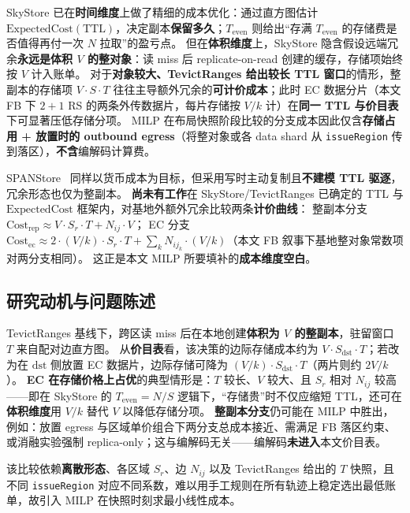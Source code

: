 \documentclass[conference]{IEEEtran}
\begin{document}
SkyStore 已在\textbf{时间维度}上做了精细的成本优化：通过直方图估计 $\mathrm{ExpectedCost}(\mathrm{TTL})$，决定副本\textbf{保留多久}；$T_{\mathrm{even}}$ 则给出``存满 $T_{\mathrm{even}}$ 的存储费是否值得再付一次 $N$ 拉取''的盈亏点。
但在\textbf{体积维度}上，SkyStore 隐含假设远端冗余\textbf{永远是体积 $V$ 的整对象}：读 miss 后 replicate-on-read 创建的缓存，存储项始终按 $V$ 计入账单。
对于\textbf{对象较大、TevictRanges 给出较长 TTL 窗口}的情形，整副本的存储项 $V{\cdot}S{\cdot}T$ 往往主导额外冗余的\textbf{可计价成本}；此时 EC 数据分片（本文 FB 下 $2{+}1$ RS 的两条外传数据片，每片存储按 $V/k$ 计）在\textbf{同一 TTL 与价目表}下可显著压低存储分项。
MILP 在布局快照阶段比较的分支成本因此仅含\textbf{存储占用 + 放置时的 outbound egress}（将整对象或各 data shard 从 \texttt{issueRegion} 传到落区），\textbf{不含}编解码计算费。

SPANStore~\cite{spanstore2013} 同样以货币成本为目标，但采用写时主动复制且\textbf{不建模 TTL 驱逐}，冗余形态也仅为整副本。
\textbf{尚未有工作}在 SkyStore/TevictRanges 已确定的 TTL 与 $\mathrm{ExpectedCost}$ 框架内，对基地外额外冗余比较两条\textbf{计价曲线}：
整副本分支 $\text{Cost}_{\mathrm{rep}}\approx V{\cdot}S_r{\cdot}T + N_{ij}{\cdot}V$；
EC 分支 $\text{Cost}_{\mathrm{ec}}\approx 2{\cdot}(V/k){\cdot}S_r{\cdot}T + \sum_k N_{ij_k}{\cdot}(V/k)$（本文 FB 叙事下基地整对象常数项对两分支相同）。
这正是本文 MILP 所要填补的\textbf{成本维度空白}。

\subsection{研究动机与问题陈述}

TevictRanges 基线下，跨区读 miss 后在本地创建\textbf{体积为 $V$ 的整副本}，驻留窗口 $T$ 来自配对边直方图。
从\textbf{价目表}看，该决策的边际存储成本约为 $V{\cdot}S_{\mathrm{dst}}{\cdot}T$；若改为在 $\mathrm{dst}$ 侧放置 EC 数据片，边际存储可降为 $(V/k){\cdot}S_{\mathrm{dst}}{\cdot}T$（两片则约 $2V/k$）。
\textbf{EC 在存储价格上占优}的典型情形是：$T$ 较长、$V$ 较大、且 $S_r$ 相对 $N_{ij}$ 较高——即在 SkyStore 的 $T_{\mathrm{even}}=N/S$ 逻辑下，``存储贵''时不仅应缩短 TTL，还可在\textbf{体积维度}用 $V/k$ 替代 $V$ 以降低存储分项。
\textbf{整副本分支}仍可能在 MILP 中胜出，例如：放置 egress 与区域单价组合下两分支总成本接近、需满足 FB 落区约束、或消融实验强制 replica-only；这与编解码无关——编解码\textbf{未进入}本文价目表。

该比较依赖\textbf{离散形态}、各区域 $S_r$、边 $N_{ij}$ 以及 TevictRanges 给出的 $T$ 快照，且不同 \texttt{issueRegion} 对应不同系数，难以用手工规则在所有轨迹上稳定选出最低账单，故引入 MILP 在快照时刻求最小线性成本。
\end{document}
